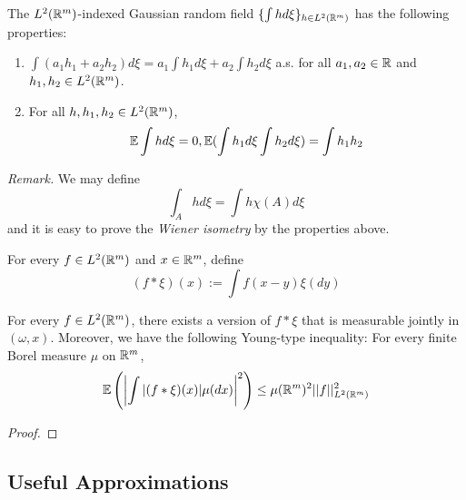\begin{proposition}
    The $L^2(\mathbb{R}^m)$-indexed Gaussian random field $\{\int h d\xi\}_{h\in L^2(\mathbb{R}^m)}$ has the following properties:
    \begin{enumerate}
        \item $\int (a_1h_1+a_2h_2)d\xi = a_1\int h_1d\xi + a_2 \int h_2 d\xi$ a.s. for all $a_1,a_2 \in \mathbb{R}$ and $h_1,h_2 \in L^2(\mathbb{R}^m)$.
        \item For all $h, h_1,h_2 \in L^2(\mathbb{R}^m)$,
        \[\mathbb{E} \int hd\xi = 0, \mathbb{E}(\int h_1d\xi \int h_2d\xi) = \int h_1h_2\]
    \end{enumerate}
\end{proposition}
    \emph{Remark.} We may define
    \[\int_A h d\xi = \int h\chi(A)d\xi\]
    and it is easy to prove the \emph{Wiener isometry} by the properties above.

\begin{definition}
    For every $f\in L^2(\mathbb{R}^m)$ and $x\in\mathbb{R}^m$, define
    \[
    (f*\xi)(x) := \int f(x-y)\xi(dy)
    \]
\end{definition}

\begin{proposition}
    For every $f\in L^2(\mathbb{R}^m)$, there exists a version of $f*\xi$ that is measurable jointly in $(\omega,x)$. Moreover, we have the following Young-type inequality: For every finite Borel measure $\mu$ on $\mathbb{R}^m$,
    \[
    \mathbb{E}\left(\left|\int|(f*\xi)(x)|\mu(dx)\right|^2\right) \leq \mu(\mathbb{R}^m)^2||f||^2_{L^2(\mathbb{R}^m)}
    \]
\end{proposition}
\begin{proof}
    
\end{proof}

\subsection{Useful Approximations}


